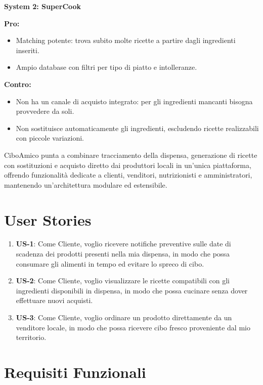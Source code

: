 \textbf{System 2: SuperCook}

\textbf{Pro:}
\begin{itemize}
    \item Matching potente: trova subito molte ricette a partire dagli ingredienti inseriti.
    \item Ampio database con filtri per tipo di piatto e intolleranze.
\end{itemize}

\textbf{Contro:}
\begin{itemize}
    \item Non ha un canale di acquisto integrato: per gli ingredienti mancanti bisogna provvedere da soli.
    \item Non sostituisce automaticamente gli ingredienti, escludendo ricette realizzabili con piccole variazioni.
\end{itemize}

CiboAmico punta a combinare tracciamento della dispensa, generazione di ricette con sostituzioni e acquisto diretto dai produttori locali in un'unica piattaforma, offrendo funzionalità dedicate a clienti, venditori, nutrizionisti e amministratori, mantenendo un'architettura modulare ed estensibile.

\section{User Stories}
\label{sec:user_stories}

\begin{enumerate}
    \item \textbf{US-1}: Come Cliente, voglio ricevere notifiche preventive sulle date di scadenza dei prodotti presenti nella mia dispensa, in modo che possa consumare gli alimenti in tempo ed evitare lo spreco di cibo.
    \item \textbf{US-2}: Come Cliente, voglio visualizzare le ricette compatibili con gli ingredienti disponibili in dispensa, in modo che possa cucinare senza dover effettuare nuovi acquisti.
    \item \textbf{US-3}: Come Cliente, voglio ordinare un prodotto direttamente da un venditore locale, in modo che possa ricevere cibo fresco proveniente dal mio territorio.
\end{enumerate}

\section{Requisiti Funzionali}
\label{sec:requisiti_funzionali}

